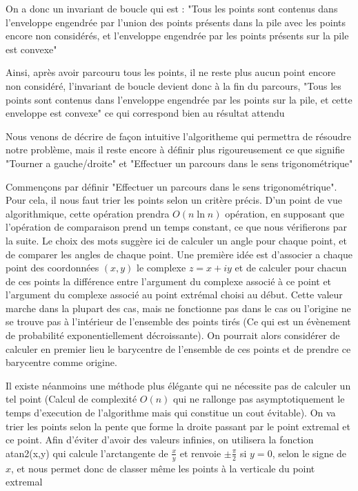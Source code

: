 \documentclass[a4paper,12pt,twoside]{article}
\begin{document}
		On a donc un invariant de boucle qui est : "Tous les points sont contenus dans l'enveloppe engendrée par l'union des points présents dans la pile avec les points encore non considérés, et l'enveloppe engendrée par les points présents sur la pile est convexe" 

		Ainsi, après avoir parcouru tous les points, il ne reste plus aucun point encore non considéré, l'invariant de boucle devient donc à la fin du parcours, "Tous les points sont contenus dans l'enveloppe engendrée par les points sur la pile, et cette enveloppe est convexe" ce qui correspond bien au résultat attendu

		Nous venons de décrire de façon intuitive l'algoritheme qui permettra de résoudre notre problème, mais il reste encore à définir plus rigoureusement ce que signifie "Tourner a gauche/droite" et "Effectuer un parcours dans le sens trigonométrique"

		Commençons par définir "Effectuer un parcours dans le sens trigonométrique". Pour cela, il nous faut trier les points selon un critère précis. D'un point de vue algorithmique, cette opération prendra $O(n\ln n)$ opération, en supposant que l'opération de comparaison prend un temps constant, ce que nous vérifierons par la suite. Le choix des mots suggère ici de calculer un angle pour chaque point, et de comparer les angles de chaque point. Une première idée est d'associer a chaque point des coordonnées $(x, y)$ le complexe $z = x + iy$ et de calculer pour chacun de ces points la différence entre l'argument du complexe associé à ce point et l'argument du complexe associé au point extrémal choisi au début. Cette valeur marche dans la plupart des cas, mais ne fonctionne pas dans le cas ou l'origine ne se trouve pas à l'intérieur de l'ensemble des points tirés (Ce qui est un évènement de probabilité exponentiellement décroissante). On pourrait alors considérer de calculer en premier lieu le barycentre de l'ensemble de ces points et de prendre ce barycentre comme origine.

		Il existe néanmoins une méthode plus élégante qui ne nécessite pas de calculer un tel point (Calcul de complexité $O(n)$ qui ne rallonge pas asymptotiquement le temps d'execution de l'algorithme mais qui constitue un cout évitable). On va trier les points selon la pente que forme la droite passant par le point extremal et ce point. Afin d'éviter d'avoir des valeurs infinies, on utilisera la fonction atan2(x,y) qui calcule l'arctangente de $\frac{x}{y}$ et renvoie $\pm \frac{\pi}{2}$ si $y = 0$, selon le signe de $x$, et nous permet donc de classer même les points à la verticale du point extremal
\end{document}
